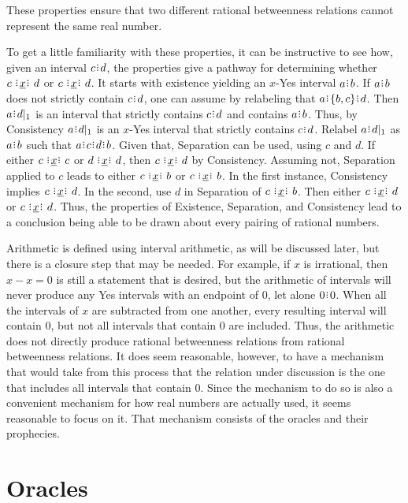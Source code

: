 \documentclass[12pt]{article}
\begin{document}
These properties ensure that two different rational betweenness relations cannot represent the same real number. 

To get a little familiarity with these properties, it can be instructive to see how, given an interval $c\rint d$, the properties give a pathway for determining whether $c \xrel d$ or \sout{$c \xrel d$}. It starts with existence yielding an $x$-Yes interval $a\rint b$. If $a\rint b$ does not strictly contain $c\rint d$, one can assume by relabeling that $a\rint \{b, c\} \rint d$. Then $a\rint d|_1$ is an interval that strictly contains $c\rint d$ and contains $a\rint b$. Thus, by Consistency $a\rint d|_1$ is an $x$-Yes interval that strictly contains $c\rint d$. Relabel $a\rint d|_1$ as $a\rint b$ such that $a\rint c\rint d\rint b$. Given that, Separation can be used, using $c$ and $d$. If either $c \xrel c$ or $d \xrel d$, then $c \xrel d$ by Consistency. Assuming  not, Separation applied to $c$ leads to either \sout{$c \xrel b$} or $c \xrel b$. In the first instance, Consistency implies \sout{$c \xrel d$}. In the second, use $d$ in Separation of $c \xrel b$. Then either $c \xrel d$ or \sout{$c \xrel d$}. Thus, the properties of Existence, Separation, and Consistency lead to a conclusion being able to be drawn about every pairing of rational numbers. 


Arithmetic is defined using interval arithmetic, as will be discussed later, but there is a closure step that may be needed. For example, if $x$ is irrational, then $x - x = 0$ is still a statement that is desired, but the arithmetic of intervals will never produce any Yes intervals with an endpoint of $0$, let alone $0\rint 0$. When all the intervals of $x$ are subtracted from one another, every resulting interval will contain $0$, but not all intervals that contain 0 are included. Thus, the arithmetic does not directly produce rational betweenness relations from rational betweenness relations. It does seem reasonable, however, to have a mechanism that would take from this process that the relation under discussion is the one that includes all intervals that contain $0$. Since the mechanism to do so is also a convenient mechanism for how real numbers are actually used, it seems reasonable to focus on it. That mechanism consists of the oracles and their prophecies. 

\section{Oracles}
\end{document}
